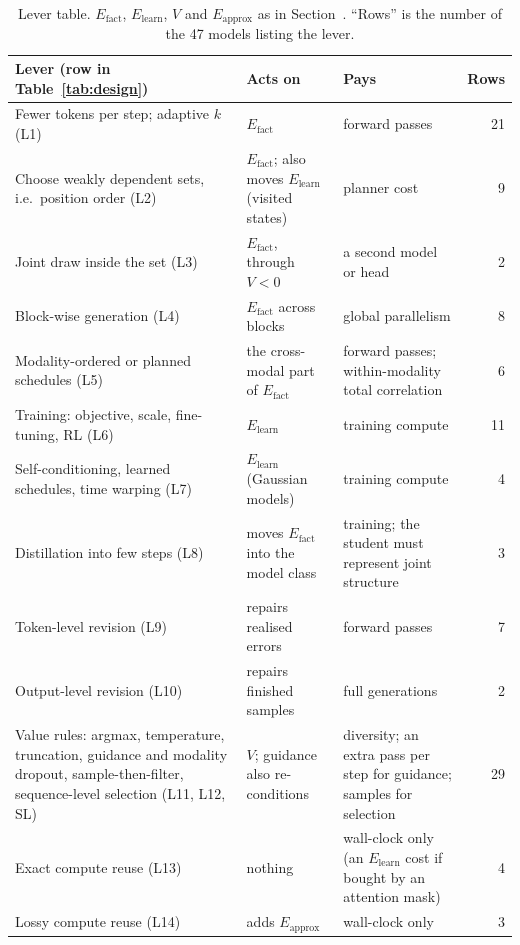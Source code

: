 \documentclass[acmsmall,screen]{acmart}
\makeatletter
\newcommand{\Mref}[1]{\@ifundefined{mr@#1}{\textbf{??}}{\csname mr@#1\endcsname}}
\newcommand{\Efact}{E_{\mathrm{fact}}}
\newcommand{\Elearn}{E_{\mathrm{learn}}}
\newcommand{\Eapprox}{E_{\mathrm{approx}}}
\makeatother
\begin{document}
\begin{table}[h]
\caption{Lever table. $\Efact$, $\Elearn$, $V$ and $\Eapprox$ as in Section~\Mref{sec:budget}. ``Rows'' is the number of the 47 models listing the lever.}
\label{tab:levers}
\footnotesize
\begin{tabular}{@{}p{3.6cm}p{3.4cm}p{3.2cm}r@{}}
\toprule
Lever (row in Table~\ref{tab:design}) & Acts on & Pays & Rows \\
\midrule
Fewer tokens per step; adaptive $k$ (L1) & $\Efact$ & forward passes & 21 \\ %
Choose weakly dependent sets, i.e.\ position order (L2) & $\Efact$; also moves $\Elearn$ (visited states) & planner cost & 9 \\
Joint draw inside the set (L3) & $\Efact$, through $V<0$ & a second model or head & 2 \\
Block-wise generation (L4) & $\Efact$ across blocks & global parallelism & 8 \\
Modality-ordered or planned schedules (L5) & the cross-modal part of $\Efact$ & forward passes; within-modality total correlation & 6 \\
Training: objective, scale, fine-tuning, RL (L6) & $\Elearn$ & training compute & 11 \\
Self-conditioning, learned schedules, time warping (L7) & $\Elearn$ (Gaussian models) & training compute & 4 \\
Distillation into few steps (L8) & moves $\Efact$ into the model class & training; the student must represent joint structure & 3 \\
Token-level revision (L9) & repairs realised errors & forward passes & 7 \\
Output-level revision (L10) & repairs finished samples & full generations & 2 \\
Value rules: argmax, temperature, truncation, guidance and modality dropout, sample-then-filter, sequence-level selection (L11, L12, SL) & $V$; guidance also re-conditions & diversity; an extra pass per step for guidance; samples for selection & 29 \\
Exact compute reuse (L13) & nothing & wall-clock only (an $\Elearn$ cost if bought by an attention mask) & 4 \\
Lossy compute reuse (L14) & adds $\Eapprox$ & wall-clock only & 3 \\
\bottomrule
\end{tabular}
\end{table}
\end{document}
